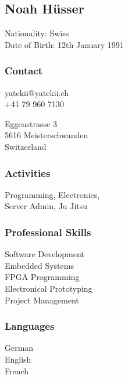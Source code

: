 %
%
\begin{facts}
    \sectionsep
    \section{Noah Hüsser}
    Nationality: Swiss\\
    Date of Birth: 12th January 1991
    \sectionsep
    
    \subsubsection{Contact}
    yatekii@yatekii.ch\\
    +41 79 960 7130\par
    \vspace{\baselineskip}
    Eggenstrasse 3\\
    5616 Meisterschwanden\\
    Switzerland
    \sectionsep
    
    \subsubsection{Activities}
    Programming, Electronics,\\
    Server Admin, Ju Jitsu
    \sectionsep
    
    \subsubsection{Professional Skills}
    Software Development\\
    Embedded Systems\\
    FPGA Programming\\
    Electronical Prototyping\\
    Project Management
    \sectionsep
    
    \subsubsection{Languages}
    German \\
    English \\
    French 
    \sectionsep
    

\end{facts}
